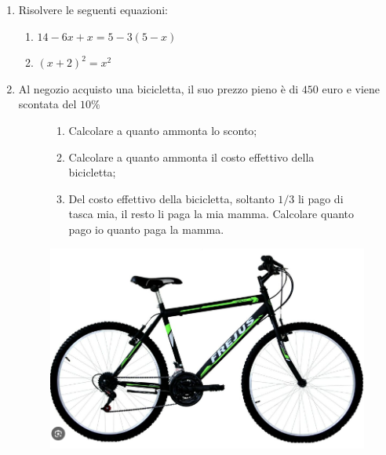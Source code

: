 \documentclass[14pt]{extarticle}
\begin{document}
\begin{enumerate}[label=\bfseries\arabic*)]
		\item Risolvere le seguenti equazioni:
		\begin{enumerate}
			\item 
				$
					14 - 6x + x = 5 -3(5 - x)
				$
			\item 
				$
					(x + 2)^2 = x^2
				$
		\end{enumerate}
		
		
		\item Al negozio acquisto una bicicletta, il suo prezzo pieno è di $450$ euro e viene scontata del $10\%$
		




		\begin{figure}[h]
		    \begin{minipage}{0.6\textwidth}
				\begin{enumerate}
			    		\item Calcolare a quanto ammonta lo sconto;
			    		\item Calcolare a quanto ammonta il costo effettivo della bicicletta;
			    		\item Del costo effettivo della bicicletta, soltanto $1/3$ li pago di tasca mia, il resto li paga la mia mamma. Calcolare quanto pago io quanto paga la mamma.
				\end{enumerate}
		    \end{minipage}
		    \hfill
		    \begin{minipage}{0.3\textwidth}
				\centering
				\includegraphics[width=\textwidth]{bicicletta.png} %
		    \end{minipage}
		\end{figure}


		
		
				

\end{enumerate}
\end{document}
